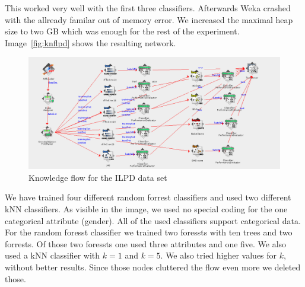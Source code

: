 \documentclass[a4paper]{article}
\begin{document}
This worked very well with the first three classifiers. Afterwards Weka crashed
with the allready familar out of memory error. We increased the maximal heap
size to two GB which was enough for the rest of the experiment. 
Image~\ref{fig:knflpd} shows the resulting network. 
\begin{figure}[h!]
\includegraphics[angle=90, scale=0.9]{liver_kf}
\caption{\label{fig:knfilpd}Knowledge flow for the ILPD data set}
\end{figure}

We have trained four different random forrest classifiers and used two different
kNN classifiers. As visible in the image, we used no special coding for the one
categorical attribute (gender). All of the used classifiers support categorical
data. For the random foresst classifier we trained two foressts with ten trees
and two forrests. Of those two foressts one used three attributes and one five. 
We also used a kNN classifier with $k=1$ and $k=5$. We also tried higher values
for $k$, without better results. Since those nodes cluttered the flow even more
we deleted those. 
\end{document}
